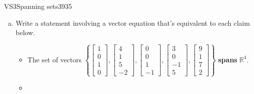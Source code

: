 \begin{exercise}{VS3}{Spanning sets}{3935} 
\begin{exerciseStatement} 

\begin{enumerate}[(a)]
\item  

 Write a statement involving a vector equation that's equivalent to each claim below. 

 

\begin{itemize}
\item  

 The set of vectors \(\left\{ \left[\begin{array}{c}
1 \\
0 \\
1 \\
0
\end{array}\right] , \left[\begin{array}{c}
4 \\
1 \\
5 \\
-2
\end{array}\right] , \left[\begin{array}{c}
0 \\
0 \\
1 \\
-1
\end{array}\right] , \left[\begin{array}{c}
3 \\
0 \\
-1 \\
5
\end{array}\right] , \left[\begin{array}{c}
9 \\
1 \\
7 \\
2
\end{array}\right] \right\}\) \textbf{spans} \(\mathbb R^4\). 

 
\item  


\end{itemize}
\end{enumerate}
\end{exerciseStatement}
\end{exercise}
